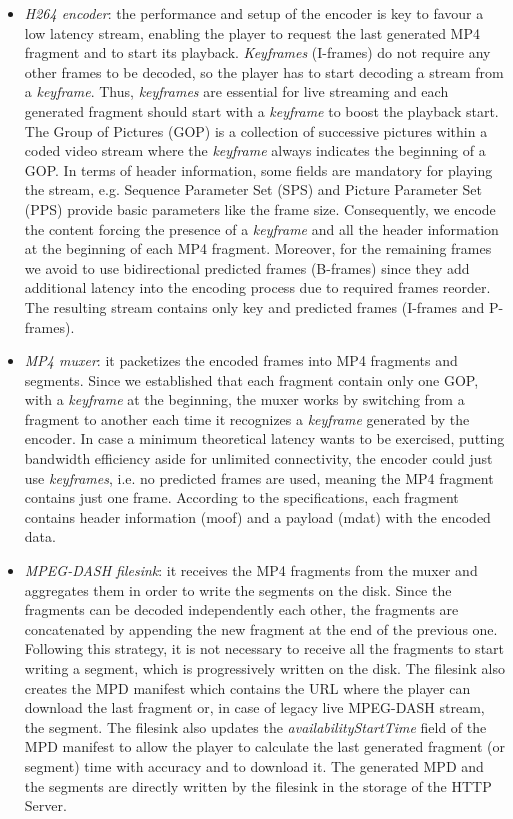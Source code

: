 \begin{itemize}
	\item \textit{H264 encoder}: the performance and setup of the encoder is key to favour a low latency stream, enabling the player to request the last generated MP4 fragment and to start its playback. \textit{Keyframes} (I-frames) do not require any other frames to be decoded, so the player has to start decoding a stream from a \textit{keyframe}. Thus, \textit{keyframes} are essential for live streaming and each generated fragment should start with a \textit{keyframe} to boost the playback start. The Group of Pictures (GOP) is a collection of successive pictures within a coded video stream where the \textit{keyframe} always indicates the beginning of a GOP. In terms of header information, some fields are mandatory for playing the stream, e.g. Sequence Parameter Set (SPS) and Picture Parameter Set (PPS) provide basic parameters like the frame size. Consequently, we encode the content forcing the presence of a \textit{keyframe} and all the header information at the beginning of each MP4 fragment. Moreover, for the remaining frames we avoid to use bidirectional predicted frames (B-frames) since they add additional latency into the encoding process due to required frames reorder. The resulting stream contains only key and predicted frames (I-frames and P-frames).
	\item \textit{MP4 muxer}: it packetizes the encoded frames into MP4 fragments and segments. Since we established that each fragment contain only one GOP, with a \textit{keyframe} at the beginning, the muxer works by switching from a fragment to another each time it recognizes a \textit{keyframe} generated by the encoder. In case a minimum theoretical latency wants to be exercised, putting bandwidth efficiency aside for unlimited connectivity, the encoder could just use \textit{keyframes}, i.e. no predicted frames are used, meaning the MP4 fragment contains just one frame. According to the specifications, each fragment contains header information (moof) and a payload (mdat) with the encoded data.
	\item \textit{MPEG-DASH filesink}: it receives the MP4 fragments from the muxer and aggregates them in order to write the segments on the disk. Since the fragments can be decoded independently each other, the fragments are concatenated by appending the new fragment at the end of the previous one. Following this strategy, it is not necessary to receive all the fragments to start writing a segment, which is progressively written on the disk. The filesink also creates the MPD manifest which contains the URL where the player can download the last fragment or, in case of legacy live MPEG-DASH stream, the segment. The filesink also updates the \textit{availabilityStartTime} field of the MPD manifest to allow the player to calculate the last generated fragment (or segment) time with accuracy and to download it. The generated MPD and the segments are directly written by the filesink in the storage of the HTTP Server.
\end{itemize}


